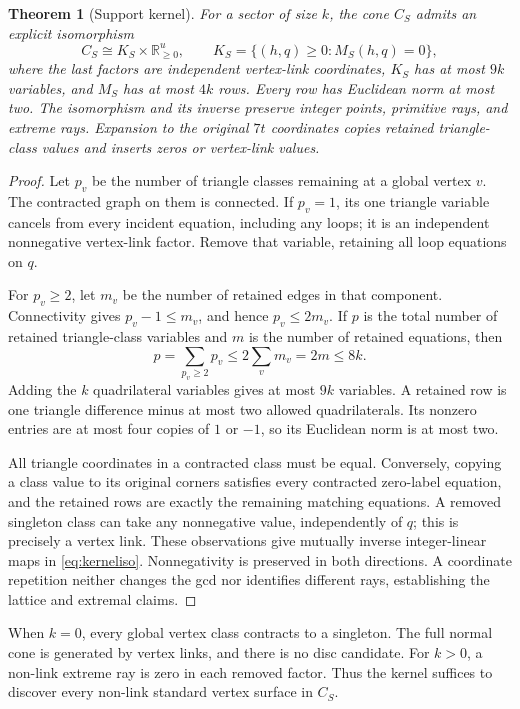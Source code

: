 \documentclass[11pt]{article}
\newtheorem{theorem}{Theorem}[section]
\theoremstyle{definition}
\theoremstyle{remark}
\newcommand{\R}{\mathbb R}
\begin{document}
\begin{theorem}[Support kernel]
\label{thm:kernel}
For a sector of size $k$, the cone $C_S$ admits an explicit isomorphism
\begin{equation}
 C_S\cong K_S\times\R_{\ge0}^{u},\qquad
 K_S=\{(h,q)\ge0:M_S(h,q)=0\},
 \label{eq:kerneliso}
\end{equation}
where the last factors are independent vertex-link coordinates, $K_S$ has at
most $9k$ variables, and $M_S$ has at most $4k$ rows. Every row has Euclidean
norm at most two. The isomorphism and its inverse preserve integer points,
primitive rays, and extreme rays. Expansion to the original $7t$ coordinates
copies retained triangle-class values and inserts zeros or vertex-link values.
\end{theorem}
\begin{proof}
Let $p_v$ be the number of triangle classes remaining at a global vertex $v$.
The contracted graph on them is connected. If $p_v=1$, its one triangle
variable cancels from every incident equation, including any loops; it is
an independent nonnegative vertex-link factor. Remove that variable, retaining
all loop equations on $q$.

For $p_v\ge2$, let $m_v$ be the number of retained edges in that component.
Connectivity gives $p_v-1\le m_v$, and hence $p_v\le2m_v$.
If $p$ is the total number of retained triangle-class variables and $m$ is the
number of retained equations, then
\[
 p=\sum_{p_v\ge2}p_v\le2\sum_v m_v=2m\le8k.
\]
Adding the $k$ quadrilateral variables gives at most $9k$ variables. A retained
row is one triangle difference minus at most two allowed quadrilaterals.
Its nonzero entries are at most four copies of $1$ or $-1$, so its Euclidean
norm is at most two.

All triangle coordinates in a contracted class must be equal. Conversely,
copying a class value to its original corners satisfies every contracted
zero-label equation, and the retained rows are exactly the remaining matching
equations. A removed singleton class can take any nonnegative value,
independently of $q$; this is precisely a vertex link. These observations give
mutually inverse integer-linear maps in \eqref{eq:kerneliso}. Nonnegativity
is preserved in both directions. A coordinate repetition neither changes
the gcd nor identifies different rays, establishing the lattice and extremal
claims.
\end{proof}

When $k=0$, every global vertex class contracts to a singleton. The full
normal cone is generated by vertex links, and there is no disc candidate.
For $k>0$, a non-link extreme ray is zero in each removed factor. Thus the
kernel suffices to discover every non-link standard vertex surface in $C_S$.
\end{document}
